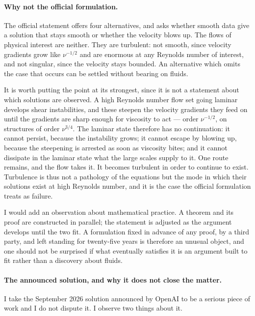 \documentclass[11pt]{article}
\begin{document}
\paragraph{Why not the official formulation.} The official statement offers four alternatives, and asks
whether smooth data give a solution that stays smooth or whether the velocity blows up. The flows of
physical interest are neither. They are turbulent: not smooth, since velocity gradients grow like
$\nu^{-1/2}$ and are enormous at any Reynolds number of interest, and not singular, since the velocity
stays bounded. An alternative which omits the case that occurs can be settled without
bearing on fluids.

It is worth putting the point at its strongest, since it is not a statement about which solutions are
observed. A high Reynolds number flow set going laminar develops shear instabilities, and these steepen
the velocity gradients they feed on until the gradients are sharp enough for viscosity to act ---
order $\nu^{-1/2}$, on structures of order $\nu^{3/4}$. The laminar state therefore has no
continuation: it cannot persist, because the instability grows; it cannot escape by blowing up, because
the steepening is arrested as soon as viscosity bites; and it cannot dissipate in the laminar state what
the large scales supply to it. One route remains, and the flow takes it. It becomes turbulent in order
to continue to exist. Turbulence is thus not a pathology of the equations but the mode in which their
solutions exist at high Reynolds number, and it is the case the official formulation treats as
failure.

I would add an observation about mathematical practice. A theorem and its proof are constructed in
parallel; the statement is adjusted as the argument develops until the two fit. A formulation fixed in
advance of any proof, by a third party, and left standing for twenty-five years is therefore an unusual
object, and one should not be surprised if what eventually satisfies it is an argument built to fit
rather than a discovery about fluids.

\paragraph{The announced solution, and why it does not close the matter.} I take the September 2026
solution announced by OpenAI to be a serious piece of work and I do not dispute it. I observe two
things about it.
\end{document}
